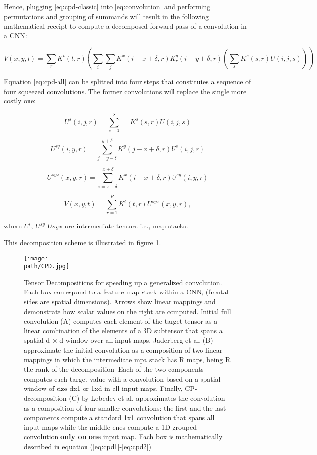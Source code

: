 Hence, plugging \ref{eq:cpd-classic} into \ref{eq:convolution} and performing permutations and grouping of summands will result in the following mathematical receipt to compute a decomposed forward pass of a convolution in a CNN: 

\begin{equation}
\label{eq:cpd-all}
	V(x, y, t)= \sum_r K^t(t,r) \left (\sum_i \sum_j K^x(i-x+\delta, r) K^y_r(i-y+\delta, r) \left (\sum_s 	K^s(s, r) U(i, j, s) \right ) \right ) 
\end{equation}  

Equation \ref{eq:cpd-all} can be splitted into four steps that constitutes a sequence of four squeezed convolutions. The former convolutions will replace the single more costly one: 

\begin{equation}
\label{eq:cpd1}
    U^s(i,j,r) =\sum^{S}_{s=1}=K^s(s,r)U(i,j,s)    
\end{equation}

\begin{equation}
    U^{sy}(i,y,r) = \sum_{j=y-\delta}^{y+\delta} K^y (j-x + \delta,r)U^{s}(i,j,r)
\end{equation}

\begin{equation}
    U^{syx}(x,y,r) = \sum_{i=x-\delta}^{x+\delta} K^x (i-x + \delta,r)U^{sy}(i,y,r)
\end{equation}

\begin{equation}
\label{eq:cpd2}
    V(x,y,t) = \sum_{r=1}^R K^t (t,r) U^{syx}(x,y,r),
\end{equation}

where $U^s$, $U^{sy}$ $U{syx}$ are intermediate tensors i.e., map stacks. 

This decomposition scheme is illustrated in figure \ref{fig:cpd-pass}. 

\begin{figure}[h!]
 \centering
 \texttt{[image: \\path/CPD.jpg]} 
 \caption{Tensor Decompositions for speeding up a generalized convolution. Each box correspond to a feature map stack within a CNN, (frontal sides are spatial dimensions). Arrows show linear mappings and demonstrate how scalar values on the right are computed. Initial full convolution (A) computes each element of the target tensor as a linear combination of the elements of a 3D subtensor that spans a spatial d × d window over all input maps. 
Jaderberg et al. (B) approximate the initial convolution as a composition of two linear mappings in which the intermediate mpa stack has R  maps, being R the rank of the decomposition. Each of the two-components 
computes each target value with a convolution based on a spatial window of size dx1 or 1xd in all input maps. Finally, CP-decomposition (C) by Lebedev et al. approximates the convolution as a composition of four smaller convolutions: the first and the last components compute a standard 1x1 convolution that spans all input maps while the middle ones compute a 1D grouped convolution \textbf{only on one} input map. Each box is mathematically described in equation (\ref{eq:cpd1}-\ref{eq:cpd2})}
 \label{fig:cpd-pass}
\end{figure}

